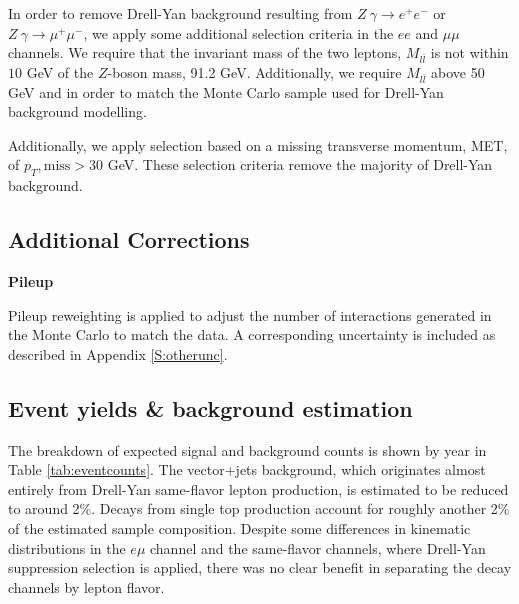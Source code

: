 In order to remove Drell-Yan background resulting from $Z\ \gamma \rightarrow e^+e^- $ or $Z \ \gamma \rightarrow \mu^+\mu^-$, we apply some additional selection criteria in the $ee$ and $\mu\mu$ channels. We require that the invariant mass of the two leptons, $M_{l\bar{l}}$ is not within $10$ \unit{GeV} of the $Z$-boson mass, 91.2 \unit{GeV}. Additionally, we require $M_{l\bar{l}}$  above 50\,GeV and in order to match the Monte Carlo sample used for Drell-Yan background modelling. 

Additionally, we apply selection based on a missing transverse momentum, MET, of $p_{T}\mathrm{,miss}>30$ \unit{GeV}. These selection criteria remove the majority of Drell-Yan background. 

\subsection{Additional Corrections}
\par \noindent
\textbf{Pileup }

Pileup reweighting is applied to adjust the number of interactions generated in the Monte Carlo to match the data. A corresponding uncertainty is included as described in Appendix \ref{S:otherunc}.



\subsection{Event yields \& background estimation}
\label{SS:bg}

The breakdown of expected signal and background counts is shown by year in Table \ref{tab:eventcounts}. The vector+jets background, which originates almost entirely from Drell-Yan same-flavor lepton production, is estimated to be reduced to around 2\%. Decays from single top production account for roughly another 2\% of the estimated sample composition. Despite some differences in kinematic distributions in the $e\mu$ channel and the same-flavor channels, where Drell-Yan suppression selection is applied, there was no clear benefit in separating the decay channels by lepton flavor.


